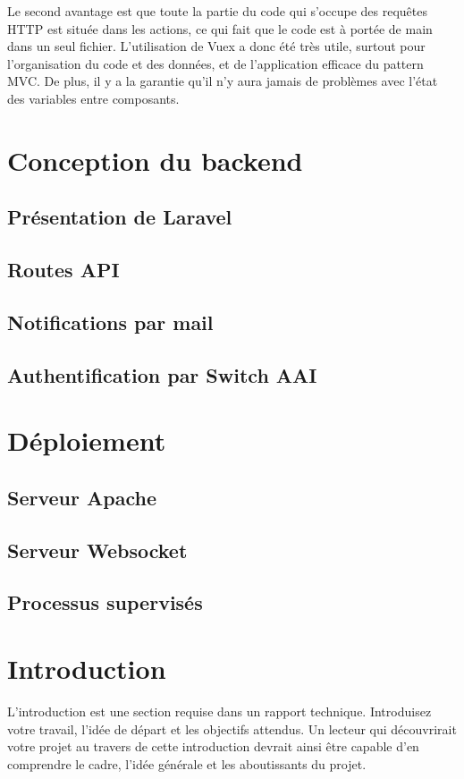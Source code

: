 \documentclass[
    iai, %
    eai, %
]{heig-tb}
\begin{document}
Le second avantage est que toute la partie du code qui s'occupe des requêtes HTTP est située dans les actions, ce qui fait que le code est à portée de main dans un seul fichier.
L'utilisation de Vuex a donc été très utile, surtout pour l'organisation du code et des données, et de l'application efficace du pattern MVC.
De plus, il y a la garantie qu'il n'y aura jamais de problèmes avec l'état des variables entre composants.

\chapter{Conception du backend}
\section{Présentation de Laravel}
\section{Routes API}
\section{Notifications par mail}
\section{Authentification par Switch AAI}

\chapter{Déploiement}
\section{Serveur Apache}
\section{Serveur Websocket}
\section{Processus supervisés}




\chapter{Introduction}
L'introduction est une section requise dans un rapport technique. Introduisez votre travail, l'idée de départ et les objectifs attendus. Un lecteur qui découvrirait votre projet au travers de cette introduction devrait ainsi être capable d'en comprendre le cadre, l'idée générale et les aboutissants du projet.
\end{document}
